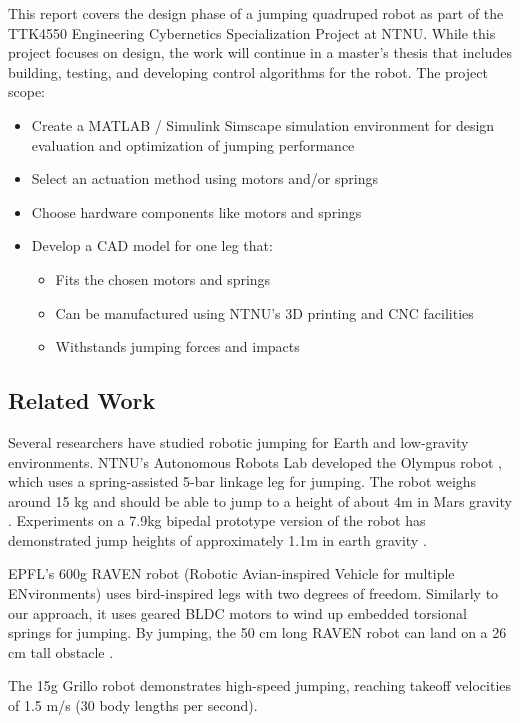This report covers the design phase of a jumping quadruped robot as part of the TTK4550 Engineering Cybernetics Specialization Project at NTNU. While this project focuses on design, the work will continue in a master's thesis that includes building, testing, and developing control algorithms for the robot.
The project scope:
\begin{itemize}
    \item Create a MATLAB / Simulink Simscape \cite{simulink_simscape} simulation environment for design evaluation and optimization of jumping performance
    \item Select an actuation method using motors and/or springs
    \item Choose hardware components like motors and springs
    \item Develop a CAD model for one leg that:
    \begin{itemize}
        \item Fits the chosen motors and springs
        \item Can be manufactured using NTNU's 3D printing and CNC facilities
        \item Withstands jumping forces and impacts
    \end{itemize}
\end{itemize}

\subsection{Related Work}
\label{sec:related_work}

Several researchers have studied robotic jumping for Earth and low-gravity environments. NTNU's Autonomous Robots Lab developed the Olympus robot \cite{OLYMPUS1} \cite{OLYMPUS2}, which uses a spring-assisted 5-bar linkage leg for jumping. The robot weighs around 15 kg and should be able to jump to a height of about 4m in Mars gravity \cite{OLYMPUS2}. Experiments on a 7.9kg bipedal prototype version of the robot has demonstrated jump heights of approximately 1.1m in earth gravity \cite{OLYMPUS1}. 

EPFL's 600g RAVEN robot (Robotic Avian-inspired Vehicle for multiple ENvironments) \cite{RAVEN} uses bird-inspired legs with two degrees of freedom. Similarly to our approach, it uses geared BLDC motors to wind up embedded torsional springs for jumping. By jumping, the 50 cm long RAVEN robot can land on a 26 cm tall obstacle \cite{RAVEN}.

The 15g Grillo robot \cite{GRILLO} demonstrates high-speed jumping, reaching takeoff velocities of 1.5 m/s (30 body lengths per second).